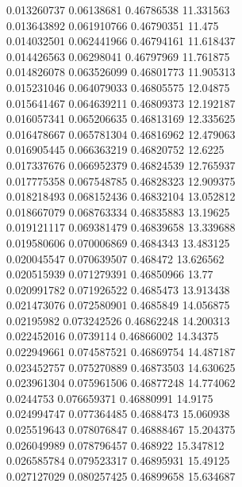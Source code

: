 {0.013260737 0.06138681 0.46786538 11.331563\\
0.013643892 0.061910766 0.46790351 11.475\\
0.014032501 0.062441966 0.46794161 11.618437\\
0.014426563 0.06298041 0.46797969 11.761875\\
0.014826078 0.063526099 0.46801773 11.905313\\
0.015231046 0.064079033 0.46805575 12.04875\\
0.015641467 0.064639211 0.46809373 12.192187\\
0.016057341 0.065206635 0.46813169 12.335625\\
0.016478667 0.065781304 0.46816962 12.479063\\
0.016905445 0.066363219 0.46820752 12.6225\\
0.017337676 0.066952379 0.46824539 12.765937\\
0.017775358 0.067548785 0.46828323 12.909375\\
0.018218493 0.068152436 0.46832104 13.052812\\
0.018667079 0.068763334 0.46835883 13.19625\\
0.019121117 0.069381479 0.46839658 13.339688\\
0.019580606 0.070006869 0.4684343 13.483125\\
0.020045547 0.070639507 0.468472 13.626562\\
0.020515939 0.071279391 0.46850966 13.77\\
0.020991782 0.071926522 0.4685473 13.913438\\
0.021473076 0.072580901 0.4685849 14.056875\\
0.02195982 0.073242526 0.46862248 14.200313\\
0.022452016 0.0739114 0.46866002 14.34375\\
0.022949661 0.074587521 0.46869754 14.487187\\
0.023452757 0.075270889 0.46873503 14.630625\\
0.023961304 0.075961506 0.46877248 14.774062\\
0.0244753 0.076659371 0.46880991 14.9175\\
0.024994747 0.077364485 0.4688473 15.060938\\
0.025519643 0.078076847 0.46888467 15.204375\\
0.026049989 0.078796457 0.468922 15.347812\\
0.026585784 0.079523317 0.46895931 15.49125\\
0.027127029 0.080257425 0.46899658 15.634687\\
}
